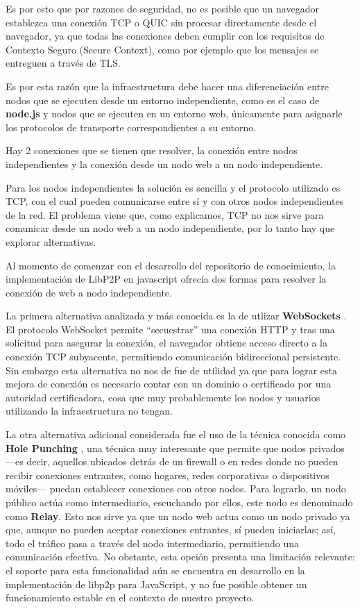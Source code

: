 Es por esto que por razones de seguridad, no es posible que un navegador establezca una conexión TCP o QUIC sin procesar directamente desde el navegador, ya que todas las conexiones deben cumplir con los requisitos de Contexto Seguro (Secure Context), como por ejemplo que los mensajes se entreguen a través de TLS.

Es por esta razón que la infraestructura debe hacer una diferenciación entre nodos que se ejecuten desde un entorno independiente, como es el caso de \textbf{node.js} \cite{nodejs} y nodos que se ejecuten en un entorno web, únicamente para asignarle los protocolos de transporte correspondientes a su entorno.

Hay 2 conexiones que se tienen que resolver, la conexión entre nodos independientes y la conexión desde un nodo web a un nodo independiente.

Para los nodos independientes la solución es sencilla y el protocolo utilizado es TCP, con el cual pueden comunicarse entre sí y con otros nodos independientes de la red. El problema viene que, como explicamos, TCP no nos sirve para comunicar desde un nodo web a un nodo independiente, por lo tanto hay que explorar alternativas.

Al momento de comenzar con el desarrollo del repositorio de conocimiento, la implementación de LibP2P en javascript ofrecía dos formas para resolver la conexión de web a nodo independiente.

La primera alternativa analizada y más conocida es la de utlizar \textbf{WebSockets} \cite{websocket}. El protocolo WebSocket permite “secuestrar” una conexión HTTP y tras una solicitud para asegurar la conexión, el navegador obtiene acceso directo a la conexión TCP subyacente, permitiendo comunicación bidireccional persistente. Sin embargo esta alternativa no nos de fue de utilidad ya que para lograr esta mejora de conexión es necesario contar con un dominio o certificado por una autoridad certificadora, cosa que muy probablemente los nodos y usuarios utilizando la infraestructura no tengan.

La otra alternativa adicional considerada fue el uso de la técnica conocida como \textbf{Hole Punching} \cite{hole-punching}, una técnica muy interesante que permite que nodos privados —es decir, aquellos ubicados detrás de un firewall o en redes donde no pueden recibir conexiones entrantes, como hogares, redes corporativas o dispositivos móviles— puedan establecer conexiones con otros nodos. Para lograrlo, un nodo público actúa como intermediario, escuchando por ellos, este nodo es denominado como \textbf{Relay}. Esto nos sirve ya que un nodo web actua como un nodo privado ya que, aunque no pueden aceptar conexiones entrantes, sí pueden iniciarlas; así, todo el tráfico pasa a través del nodo intermediario, permitiendo una comunicación efectiva. No obstante, esta opción presenta una limitación relevante: el soporte para esta funcionalidad aún se encuentra en desarrollo en la implementación de libp2p para JavaScript, y no fue posible obtener un funcionamiento estable en el contexto de nuestro proyecto.

